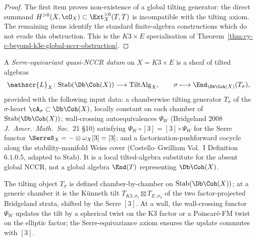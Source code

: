 \begin{proof}
The first item proves non-existence of a global tilting generator:
the direct summand $H^{>0}(X,\cO_X)\subset \Ext_X^{>0}(T,T)$ is
incompatible with the tilting axiom. The remaining items identify the
standard finite-algebra constructions which do not evade this
obstruction. This is the $K3\times E$ specialisation of
Theorem~\ref{thm:cy-c-beyond-k3e-global-nccr-obstruction}.
\end{proof}

\begin{definition}[Serre-equivariant quasi-NCCR datum on $X = K3 \times E$]
\label{gluing:def:serre-equivariant-quasi-nccr}
A \emph{Serre-equivariant quasi-NCCR datum} on $X = K3 \times E$ is a
sheaf of tilted algebras
\[
 \mathscr{L}_X \colon \mathrm{Stab}(\Db\Coh(X)) \longrightarrow
 \mathrm{TiltAlg}_X,
 \qquad
 \sigma \longmapsto \End_{\Db\Coh(X)}(T_\sigma),
\]
provided with the following input data: a chamberwise tilting generator
$T_\sigma$ of the $\sigma$-heart $\cA_\sigma\subset\Db\Coh(X)$, locally
constant on each chamber of $\mathrm{Stab}(\Db\Coh(X))$; wall-crossing
autoequivalences $\Psi_W$ (Bridgeland 2008 \emph{J.\ Amer.\ Math.\ Soc.}~21
\S 10) satisfying $\Psi_W\circ[3]=[3]\circ\Psi_W$ for the Serre functor
$\SerreS_X=-\otimes\omega_X[3]=[3]$; and a factorisation-pushforward
cocycle along the stability-manifold Weiss cover
(Costello--Gwilliam Vol.~I Definition~$6.1.0.5$, adapted to
$\mathrm{Stab}$). It is a local tilted-algebra substitute for the
absent global NCCR, not a global algebra $\End(T)$ representing
$\Db\Coh(X)$.
\end{definition}

\begin{remark}
\label{gluing:rem:quasi-nccr-locally-defined}
The tilting object $T_\sigma$ is defined chamber-by-chamber on
$\mathrm{Stab}(\Db\Coh(X))$; at a generic chamber it is the
K\"unneth tilt $T_{K3, \sigma_1} \boxtimes T_{E, \sigma_2}$ of
the two factor-projected Bridgeland strata, shifted by the Serre
$[3]$. At a wall, the wall-crossing functor $\Psi_W$ updates the
tilt by a spherical twist on the K3 factor or a Poincar\'e-FM twist
on the elliptic factor; the Serre-equivariance axiom ensures the
update commutes with $[3]$.
\end{remark}

